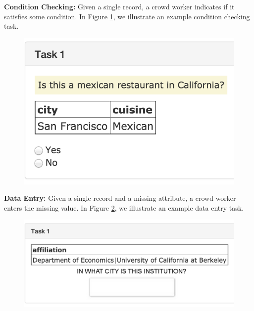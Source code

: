 \noindent\textbf{Condition Checking: } Given a single record, a crowd worker indicates if it satisfies some condition. In Figure \ref{fig:condition},
we illustrate an example condition checking task.
\begin{figure}[ht!]
\centering
\includegraphics[scale=0.25]{figs/condition.png}
\caption{ \label{fig:condition}}\vspace{-.5em}
\end{figure}

\noindent\textbf{Data Entry: } Given a single record and a missing attribute, a crowd worker enters the missing value. In Figure \ref{fig:entry},
we illustrate an example data entry task.

\begin{figure}[ht!]
\centering
\includegraphics[scale=0.25]{figs/entry.png}
\caption{ \label{fig:entry}}\vspace{-.5em}
\end{figure}




